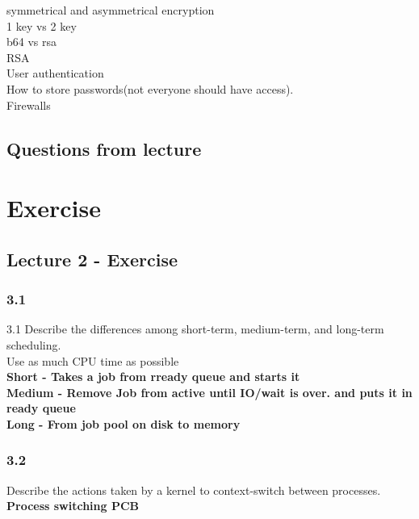 \documentclass[a4paper,10pt,titlepage]{report}
\begin{document}
symmetrical and asymmetrical encryption \\
	1 key vs 2 key\\
	b64 vs rsa \\
	RSA \\

User authentication \\
	How to store passwords(not everyone should have access). \\
	Firewalls \\
	

\subsection{Questions from lecture}

























\newpage
\section{Exercise}
\subsection{Lecture 2 - Exercise}
\subsubsection{3.1}
3.1 Describe the differences among short-term, medium-term, and long-term scheduling.\\
Use as much CPU time as possible \\
\textbf{Short - Takes a job from rready queue and starts it}\\
\textbf{Medium - Remove Job from active until IO/wait is over. and puts it in ready queue}\\
\textbf{Long - From job pool on disk to memory }\\ \vspace{5mm}


\subsubsection{3.2}
Describe the actions taken by a kernel to context-switch between processes.\\
\textbf{Process switching PCB}\\ \vspace{5mm}
\end{document}
